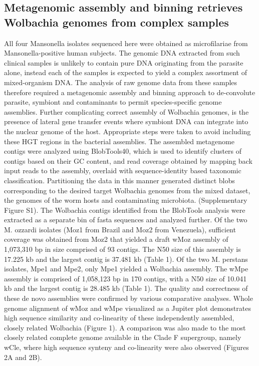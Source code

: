 \documentclass[10pt, a4paper, twocolumn]{article} %
\begin{document}
\subsection{Metagenomic assembly and binning retrieves Wolbachia genomes from complex samples}
All four Mansonella isolates sequenced here were obtained as microfilariae from Mansonella-positive human subjects. The genomic DNA extracted from such clinical samples is unlikely to contain pure DNA originating from the parasite alone, instead each of the samples is expected to yield a complex assortment of mixed-organism DNA. The analysis of raw genome data from these samples therefore required a metagenomic assembly and binning approach to de-convolute parasite, symbiont and contaminants to permit species-specific genome assemblies. Further complicating correct assembly of Wolbachia genomes, is the presence of lateral gene transfer events where symbiont DNA can integrate into the nuclear genome of the host. Appropriate steps were taken to avoid including these HGT regions in the bacterial assemblies. 
	The assembled metagenome contigs were analyzed using BlobTools40, which is used to identify clusters of contigs based on their GC content, and read coverage obtained by mapping back input reads to the assembly, overlaid with sequence-identity based taxonomic classification. Partitioning the data in this manner generated distinct blobs corresponding to the desired target Wolbachia genomes from the mixed dataset, the genomes of the worm hosts and contaminating microbiota. (Supplementary Figure S1). The Wolbachia contigs identified from the BlobTools analysis were extracted as a separate bin of fasta sequences and analyzed further.
Of the two M. ozzardi isolates (Moz1 from Brazil and Moz2 from Venezuela), sufficient coverage was obtained from Moz2 that yielded a draft wMoz assembly of 1,073,310 bp in size comprised of 93 contigs. The N50 size of this assembly is 17.225 kb and the largest contig is 37.481 kb (Table 1). Of the two M. perstans isolates, Mpe1 and Mpe2, only Mpe1 yielded a Wolbachia assembly. The wMpe assembly is comprised of 1,058,123 bp in 170 contigs, with a N50 size of 10.041 kb and the largest contig is 28.485 kb (Table 1). 
The quality and correctness of these de novo assemblies were confirmed by various comparative analyses. Whole genome alignment of wMoz and wMpe visualized as a Jupiter plot demonstrates high sequence similarity and co-linearity of these independently assembled, closely related Wolbachia (Figure 1). A comparison was also made to the most closely related complete genome available in the Clade F supergroup, namely wCle, where high sequence synteny and co-linearity were also observed (Figures 2A and 2B). 
\end{document}
